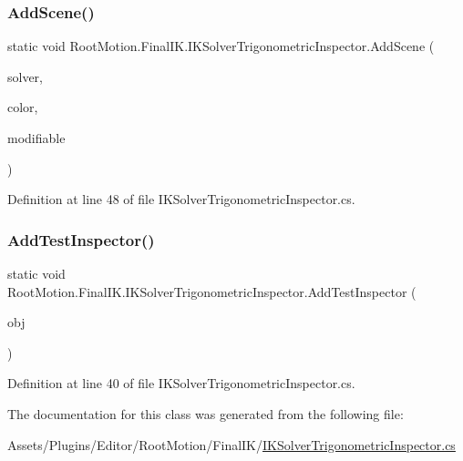 \subsubsection{\texorpdfstring{Add\+Scene()}{AddScene()}}
{\footnotesize\ttfamily static void Root\+Motion.\+Final\+I\+K.\+I\+K\+Solver\+Trigonometric\+Inspector.\+Add\+Scene (\begin{DoxyParamCaption}\item[{I\+K\+Solver\+Trigonometric}]{solver,  }\item[{Color}]{color,  }\item[{bool}]{modifiable }\end{DoxyParamCaption})\hspace{0.3cm}{\ttfamily [static]}}



Definition at line 48 of file I\+K\+Solver\+Trigonometric\+Inspector.\+cs.

\mbox{\label{class_root_motion_1_1_final_i_k_1_1_i_k_solver_trigonometric_inspector_ac081997c71d7498497cf6280060a7450}} 
\subsubsection{\texorpdfstring{Add\+Test\+Inspector()}{AddTestInspector()}}
{\footnotesize\ttfamily static void Root\+Motion.\+Final\+I\+K.\+I\+K\+Solver\+Trigonometric\+Inspector.\+Add\+Test\+Inspector (\begin{DoxyParamCaption}\item[{Serialized\+Object}]{obj }\end{DoxyParamCaption})\hspace{0.3cm}{\ttfamily [static]}}



Definition at line 40 of file I\+K\+Solver\+Trigonometric\+Inspector.\+cs.



The documentation for this class was generated from the following file\+:\begin{DoxyCompactItemize}
\item 
Assets/\+Plugins/\+Editor/\+Root\+Motion/\+Final\+I\+K/\mbox{\hyperlink{_i_k_solver_trigonometric_inspector_8cs}{I\+K\+Solver\+Trigonometric\+Inspector.\+cs}}\end{DoxyCompactItemize}
